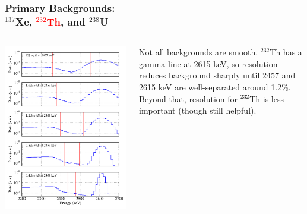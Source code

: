 \documentclass{beamer}
\begin{document}
\begin{frame}
\begin{center}
\frametitle{\hfill Primary Backgrounds:\\\hfill $^{137}$Xe, \textcolor{red}{$^{232}$Th}, and $^{238}$U}
\end{center}
\begin{columns}
\begin{column}{.6\textwidth}
\includegraphics[keepaspectratio=true,width=\textwidth]{Th_Spectra_vs_Res.pdf}
\end{column}
\begin{column}{.4\textwidth}
Not all backgrounds are smooth.  $^{232}$Th has a gamma line at 2615 keV, so resolution reduces background sharply until 2457 and 2615 keV are well-separated around 1.2\%.\\[\baselineskip]

Beyond that, resolution for $^{232}$Th is less important (though still helpful).
\end{column}
\end{columns}
\end{frame}
\end{document}
